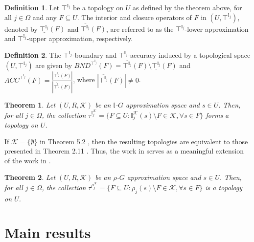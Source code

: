 \documentclass{article}
\theoremstyle{theorem}
\newtheorem{theorem}{Theorem}[section]
\theoremstyle{definition}
\newtheorem{definition}{Definition}[section]
\theoremstyle{remark}
\begin{document}
\begin{definition} \label{d10} \cite{Al-shami 2021}
Let $\top^{\mathbb{I}_j}$ be a topology on $U$ as defined by the theorem above, for all $j \in \Omega$ and any $F\subseteq U$. The interior and closure operators of $F$ in $(U,  \top^{\mathbb{I}_j})$, denoted by  $\underline{\top^{\mathbb{I}_j}}(F)$ and $\overline{\top^{\mathbb{I}_j}}(F)$, are referred to as the $\top^{\mathbb{I}_j}$-lower approximation and $\top^{\mathbb{I}_j}$-upper approximation, respectively.
\end{definition}

\begin{definition} \label{d11} \cite{Al-shami 2021} The $\top^{\mathbb{I}_j}$-boundary and $\top^{\mathbb{I}_j}$-accuracy induced by a topological space $(U, \top^{\mathbb{I}_j})$ are  given by $BND^{\top^{\mathbb{I}_j}}(F) =  \overline{\top^{\mathbb{I}_j}}(F) \setminus  \underline{\top^{\mathbb{I}_j}}(F)$ and $ACC^{\top^{\mathbb{I}_j}}(F) = \frac{|\underline{\top^{\mathbb{I}_j}}(F)|}{|\overline{\top^{\mathbb{I}_j}}(F)|}$, where $|\overline{\top^{\mathbb{I}_j}}(F)|\neq0$.
\end{definition}
\color{black}

\begin{theorem}\label{t103} \cite{Al-shami 2024} Let $(U, R, \mathcal{K})$ be an $\mathbb{I}$-$G$ approximation space and $s\in U$. Then, for all $j \in \Omega$, the collection $\tau^{{\mathbb{I}_{j}^{\mathcal{K}}}} = \{F \subseteq U :  {\mathbb{I}_{j}^{\mathcal{K}}}(s) \setminus F \in \mathcal{K}, \forall s \in F\}$ forms a topology on $U$.
\end{theorem}

If $\mathcal{K} = \{\emptyset\}$ in Theorem 5.2 \cite{Al-shami 2024}, then the resulting topologies are equivalent to those presented in
Theorem 2.11 \cite{Al-shami 2021}. Thus, the  work in \cite{Al-shami 2024} serves as a meaningful extension of the work in  \cite{Al-shami 2021}.

\begin{theorem}\label{t1111} \cite{Al-shami 2021b} Let $(U, R, \mathcal{K})$ be an $\rho$-$G$ approximation space and $s\in U$. Then, for all $j \in \Omega$, the collection $\tau^{{\rho_{j}^{\mathcal{K}}}} = \{F \subseteq U :  \rho_{j}(s) \setminus F \in \mathcal{K}, \forall s \in F\}$ is a topology on $U$.
\end{theorem}

\section{Main results}
\end{document}
